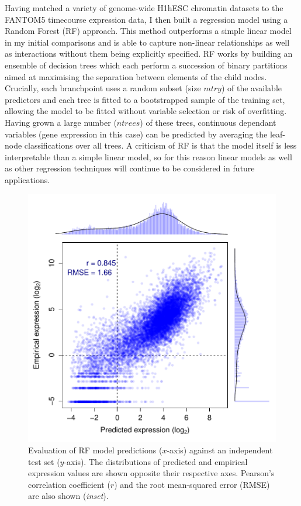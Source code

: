\documentclass[a4paper,10pt,oneside]{book}
\begin{document}
Having matched a variety of genome-wide H1hESC chromatin datasets
to the FANTOM5 timecourse expression data, I then built a regression
model using a Random Forest (RF) approach.\cite{Breiman2001} This method outperforms a simple
linear model in my initial comparisons and is able to capture non-linear relationships as well
as interactions without them being explicitly specified.\cite{Diaz2006} RF works by
building an ensemble of decision trees which each perform a succession
of binary partitions aimed at maximising the separation between elements
of the child nodes.\cite{Svetnik2003} Crucially, each branchpoint uses a random subset
(size $mtry$) of the
available predictors and each tree is fitted to a bootstrapped sample of
the training set, allowing the model to
be fitted without variable selection or risk of
overfitting.\cite{Diaz2006, Dasgupta2012} Having grown a large number ($ntrees$)
of these
trees, continuous dependant variables (gene expression in
this case) can be predicted by averaging the leaf-node classifications
over all trees. A criticism of RF is that the model itself is less interpretable than
a simple linear model, so for this reason linear models as well as
other regression techniques will continue to be considered in future applications.  \\

\begin{figure}[H]
\begin{center} 
\includegraphics[width=.9\textwidth]{r1_fig/RandomForest_10CV_50d.pdf}
\captionsetup{width=.9\textwidth} 
\caption{Evaluation of RF model predictions ($x$-axis) against an independent
  test set ($y$-axis). The distributions of predicted and empirical
  expression values are shown opposite their
  respective axes. Pearson's correlation coefficient ($r$) and the root
  mean-squared error (RMSE) are also shown (\emph{inset}).
}\label{fig:model}
\end{center} 
\end{figure} 
\end{document}

